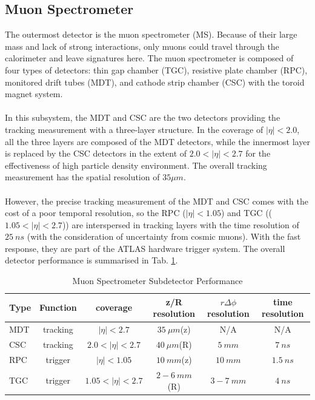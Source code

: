 \subsection{Muon Spectrometer\cite{MS_all}}
The outermost detector is the muon spectrometer (MS). Because of their large mass and lack of strong interactions, only muons could travel through the calorimeter and leave signatures here. The muon spectrometer is composed of four types of detectors: thin gap chamber (TGC), resistive plate chamber (RPC), monitored drift tubes (MDT), and cathode strip chamber (CSC) with the toroid magnet system.  
\\
\\In this subsystem, the MDT and CSC are the two detectors providing the tracking measurement with a three-layer structure. In the coverage of $|\eta|<2.0$, all the three layers are composed of the MDT detectors, while the innermost layer is replaced by the CSC detectors in the extent of $2.0<|\eta|<2.7$ for the effectiveness of high particle density environment. The overall tracking measurement has the spatial resolution of $35 \mu m$.
\\
\\However, the precise tracking measurement of the MDT and CSC comes with the cost of a poor temporal resolution, so the RPC ($|\eta|<1.05$) and TGC (($1.05<|\eta|<2.7$)) are interspersed in tracking layers with the time resolution of $25~ns$ (with the consideration of uncertainty from cosmic muons). With the fast response, they are part of the ATLAS hardware trigger system. The overall detector performance is summarised in Tab. \ref{Tab:ms}.

\begin{table}[h]
	\caption{Muon Spectrometer Subdetector Performance}
	\renewcommand{\arraystretch}{1.3}
	\centering
	\begin{tabular}{l | c | c | c | c | c }
		\hline
		\hline
		{\bf Type}     &{\bf Function} &{\bf coverage}    &{\bf z/R resolution}  &{\bf $r \Delta \phi$ resolution}&{\bf time resolution}\\
		\hline
		MDT            &tracking       &$|\eta|<2.7$      &$35~\mu m$(z)          &N/A                             &N/A            \\
		\hline
		CSC            &tracking       &$2.0<|\eta|<2.7$  &$40~\mu m$(R)          &$5~mm$                           &$7~ns$          \\
		\hline
		RPC            &trigger        &$|\eta|<1.05$     &$10~mm$(z)             &$10~mm$                          &$1.5~ns$         \\
		\hline
		TGC            &trigger        &$1.05<|\eta|<2.7$ &$2-6~mm$(R)            &$3-7~mm$                         &$4~ns$           \\
		\hline
	\end{tabular}
	\label{Tab:ms}
\end{table}

